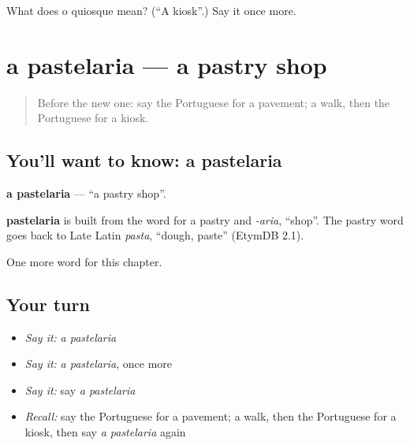 \begin{tcolorbox}[breakable,colback=teal!4,colframe=teal!35!black,title={Before you move on}]
What does o quiosque mean? (\textquotedblleft{}A kiosk\textquotedblright{}.) Say it once more.
\end{tcolorbox}
\section[a pastelaria]{a pastelaria — a pastry shop}

\label{lesson:PT-C90-pastelaria}



\begin{quote}
Before the new one: say the Portuguese for a pavement; a walk, then the Portuguese for a kiosk.
\end{quote}

\subsection*{You'll want to know: a pastelaria}
\textbf{a pastelaria} — \textquotedblleft{}a pastry shop\textquotedblright{}.

\begin{cousinweb}
\textbf{pastelaria} is built from the word for a pastry and \emph{-aria}, \textquotedblleft{}shop\textquotedblright{}. The pastry word goes back to Late Latin \emph{pasta}, \textquotedblleft{}dough, paste\textquotedblright{} (EtymDB 2.1).
\end{cousinweb}

\begin{grammarlens}[title={What you've built}]
One more word for this chapter.
\end{grammarlens}

\subsection*{Your turn}
\begin{itemize}
\raggedright
  \item \emph{Say it:} \emph{a pastelaria}
  \item \emph{Say it:} \emph{a pastelaria}, once more
  \item \emph{Say it:} say \emph{a pastelaria}
  \item \emph{Recall:} say the Portuguese for a pavement; a walk, then the Portuguese for a kiosk, then say \emph{a pastelaria} again
\end{itemize}

